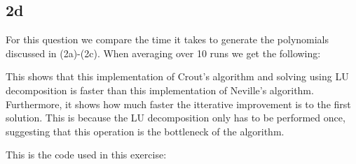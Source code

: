 \subsection*{2d}
For this question we compare the time it takes to generate the polynomials
discussed in (2a)-(2c). When averaging over 10 runs we get the following:



\noindent
This shows that this implementation of Crout's algorithm and solving using
LU decomposition is faster than this implementation of Neville's algorithm.
Furthermore, it shows how much faster the itterative improvement is 
to the first solution. This is because the LU decomposition only has to be
performed once, suggesting that this operation is the bottleneck of the 
algorithm.

\noindent
This is the code used in this exercise:
